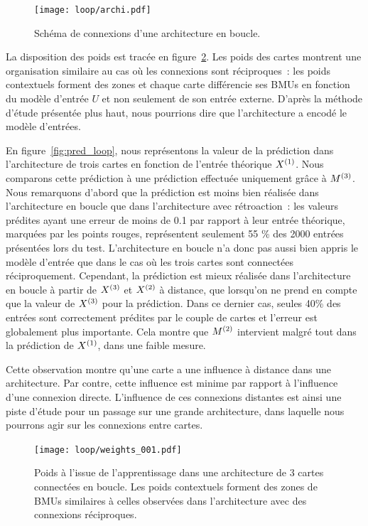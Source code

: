 \documentclass[../main]{subfiles}
\begin{document}
\begin{figure}[h!]
	\centering\texttt{[image: loop/archi.pdf]}
	\caption{Schéma de connexions d'une architecture en \og boucle\fg{}. \label{fig:archi_loop}}
\end{figure}

La disposition des poids est tracée  en figure~\ref{fig:3som_loop}.
Les poids des cartes montrent une organisation similaire au cas où les connexions sont réciproques~: les poids contextuels forment des zones et chaque carte différencie ses BMUs en fonction du modèle d'entrée $U$ et non seulement de son entrée externe.
D'après la méthode d'étude présentée plus haut, nous pourrions dire que l'architecture a encodé le modèle d'entrées.

En figure~\ref{fig:pred_loop}, nous représentons la valeur de la prédiction dans l'architecture de trois cartes en fonction de l'entrée théorique $X^{({1})}$. Nous comparons cette prédiction à une prédiction effectuée uniquement grâce à $M^{({3})}$.
Nous remarquons d'abord que la prédiction est moins bien réalisée dans l'architecture en boucle que dans l'architecture avec rétroaction~: les valeurs prédites ayant une erreur de moins de 0.1 par rapport à leur entrée théorique, marquées par les points rouges, représentent seulement 55 \% des 2000 entrées présentées lors du test.
L'architecture en boucle n'a donc pas aussi bien appris le modèle d'entrée que dans le cas où les trois cartes sont connectées réciproquement.
Cependant, la prédiction est mieux réalisée dans l'architecture en boucle à partir de $X^{({3})}$ et $X^{({2})}$ à distance, que lorsqu'on ne prend en compte que la valeur de $X^{({3})}$ pour la prédiction. Dans ce dernier cas, seules 40\% des entrées sont correctement prédites par le couple de cartes et l'erreur est globalement plus importante.
Cela montre que $M^{({2})}$ intervient malgré tout dans la prédiction de $X^{({1})}$, dans une faible mesure.

Cette observation montre qu'une carte a une influence à distance dans une architecture. Par contre, cette influence est minime par rapport à l'influence d'une connexion directe.
L'influence de ces connexions distantes est ainsi une piste d'étude pour un passage sur une grande architecture, dans laquelle nous pourrons agir sur les connexions entre cartes.

\begin{figure}[h!]
		\centering\texttt{[image: loop/weights\_001.pdf]}
		\caption{Poids à l'issue de l'apprentissage dans une architecture de 3 cartes connectées en boucle. Les poids contextuels forment des zones de BMUs similaires à celles observées dans l'architecture avec des connexions réciproques.\label{fig:3som_loop}}
\end{figure}
\end{document}
